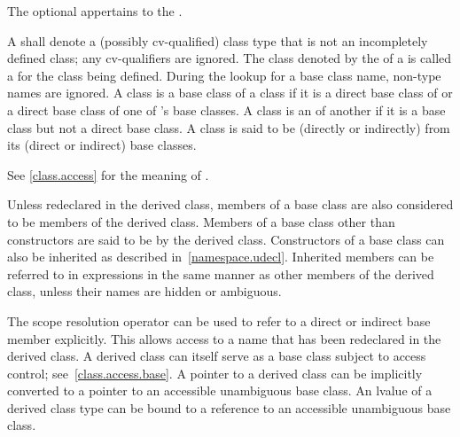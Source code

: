 %
%
\begin{bnf}
\br
    \br
    \br
\end{bnf}

The optional  appertains to the .

\pnum
{}%
A  shall denote
a (possibly cv-qualified) class type that is not
an incompletely defined class;
any cv-qualifiers are ignored.
The class denoted by the  of
a  is called a
for the class being defined.
%
%
During the lookup for a base class name, non-type names are
ignored.
A class  is a
base class of a class  if it is a direct base class of
 or a direct base class of one of 's base classes.
A class is an  of another if it is a base
class but not a direct base class. A class is said to be (directly or
indirectly)  from its (direct or indirect) base
classes.
\begin{note}
See \ref{class.access} for the meaning of
.
\end{note}
%
Unless redeclared in the derived class, members of a base class are also
considered to be members of the derived class.
Members of a base class other than constructors are said to be
by the derived class. Constructors of a base class
can also be inherited as described in~\ref{namespace.udecl}.
Inherited members can be referred to in
expressions in the same manner as other members of the derived class,
unless their names are hidden or ambiguous.
%
\begin{note}
The scope resolution operator \tcode{::} can be used
to refer to a direct or indirect base member explicitly. This allows
access to a name that has been redeclared in the derived class. A
derived class can itself serve as a base class subject to access
control; see~\ref{class.access.base}. A pointer to a derived class can be
implicitly converted to a pointer to an accessible unambiguous base
class. An lvalue of a derived class type can be bound
to a reference to an accessible unambiguous base
class.
\end{note}

